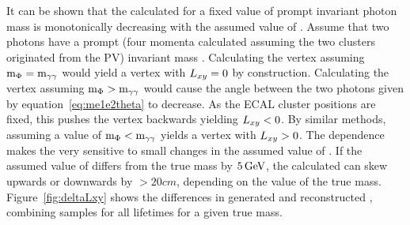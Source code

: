 It can be shown that the calculated \lxy for a fixed value of prompt invariant photon mass \mgg is monotonically decreasing with the assumed value of \mphi. Assume that two photons have a prompt (four momenta calculated assuming the two clusters originated from the PV) invariant mass \mgg. Calculating the vertex assuming $\text{m}_\Phi=\text{m}_{\gamma\gamma}$ would yield a vertex with $L_{xy}=0$ by construction. Calculating the vertex assuming $\text{m}_\Phi>\text{m}_{\gamma\gamma}$ would cause the angle between the two photons given by equation~\ref{eq:me1e2theta} to decrease. As the ECAL cluster positions are fixed, this pushes the vertex backwards yielding $L_{xy}<0$. By similar methods, assuming a value of $\text{m}_\Phi<\text{m}_{\gamma\gamma}$ yields a vertex with $L_{xy}>0$. The dependence makes the \lxy very sensitive to small changes in the assumed value of \mphi. If the assumed value of \mphi differs from the true mass by $5\,\text{Ge\hspace{-.08em}V}$, the calculated \lxy can skew upwards or downwards by $>20\unit{cm}$, depending on the value of the true mass. Figure~\ref{fig:deltaLxy} shows the differences in generated and reconstructed \lxy, combining samples for all lifetimes for a given true mass.

